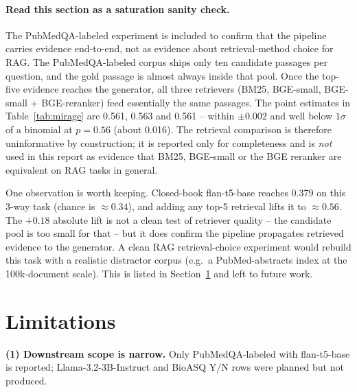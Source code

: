 \documentclass[11pt,a4paper]{article}
\begin{document}
\begin{table}[ht]
    \centering
    \caption{Downstream MIRAGE/MedRAG accuracy on the PubMedQA-labeled
    test set ($n = 1{,}000$). The closed-book row ablates the retrieval
    contribution. Llama-3.2-3B-Instruct rows and the BioASQ Y/N task
    were planned but are not reported in this draft (see note below).}
    \label{tab:mirage}
    \small
    
\end{table}

\paragraph{Read this section as a saturation sanity check.}
The PubMedQA-labeled experiment is included to confirm that the
pipeline carries evidence end-to-end, not as evidence about
retrieval-method choice for RAG. The PubMedQA-labeled corpus ships
only ten candidate passages per question, and the gold passage is
almost always inside that pool. Once the top-five evidence reaches
the generator, all three retrievers (BM25, BGE-small, BGE-small +
BGE-reranker) feed essentially the same passages. The point estimates
in Table~\ref{tab:mirage} are 0.561, 0.563 and 0.561 -- within
$\pm 0.002$ and well below $1\sigma$ of a binomial at $p=0.56$
(about 0.016). The retrieval comparison is therefore uninformative
by construction; it is reported only for completeness and is
\emph{not} used in this report as evidence that BM25, BGE-small or
the BGE reranker are equivalent on RAG tasks in general.

One observation is worth keeping. Closed-book flan-t5-base reaches
0.379 on this 3-way task (chance is $\approx 0.34$), and adding any
top-5 retrieval lifts it to $\approx 0.56$. The $+0.18$ absolute lift
is not a clean test of retriever quality -- the candidate pool is
too small for that -- but it does confirm the pipeline propagates
retrieved evidence to the generator. A clean RAG retrieval-choice
experiment would rebuild this task with a realistic distractor
corpus (e.g.\ a PubMed-abstracts index at the 100k-document scale).
This is listed in Section~\ref{sec:limitations} and left to future
work.

\section{Limitations}
\label{sec:limitations}

\textbf{(1) Downstream scope is narrow.} Only PubMedQA-labeled with
flan-t5-base is reported; Llama-3.2-3B-Instruct and BioASQ Y/N rows
were planned but not produced.
\end{document}
